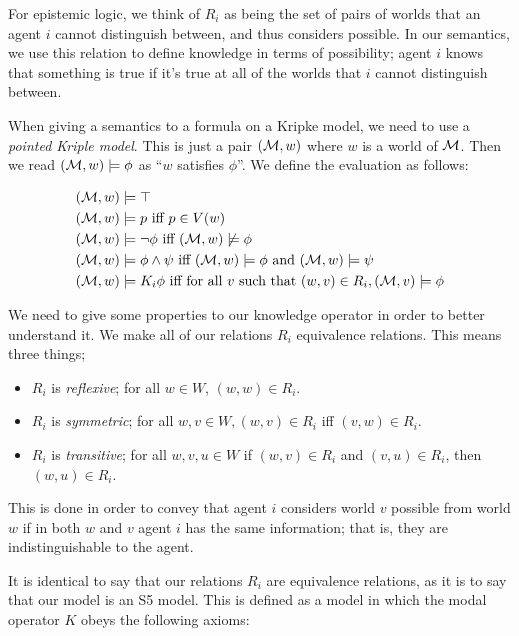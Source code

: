 \documentclass[12pt, a4paper]{article}
\begin{document}
For epistemic logic, we think of $R_i$ as being the set of pairs of worlds that
an agent $i$ cannot distinguish between, and thus considers possible. In our
semantics, we use this relation to define knowledge in terms of possibility;
agent $i$ knows that something is true if it's true at all of the worlds that
$i$ cannot distinguish between.

\bigskip

When giving a semantics to a formula on a Kripke model, we need to use a
\textit{pointed Kriple model}. This is just a pair $(\mathcal{M}, w)$ where $w$ is a
world of $\mathcal{M}$. Then we read $(\mathcal{M}, w) \models \phi$ as ``$w$ satisfies
$\phi$''. We define the evaluation as follows:

\begin{align*}
  (\mathcal{M}, w) & \models \top \\
  (\mathcal{M}, w) & \models p \text{ iff } p \in V(w) \\
  (\mathcal{M}, w) & \models \neg \phi \text{ iff } (\mathcal{M}, w) \not \models \phi \\
  (\mathcal{M}, w) & \models \phi \land \psi \text{ iff } (\mathcal{M}, w) \models \phi \text{ and } (\mathcal{M}, w) \models \psi \\
  (\mathcal{M}, w) & \models K_i \phi \text{ iff for all $v$ such that } (w, v) \in R_i, (\mathcal{M}, v) \models \phi 
\end{align*}

\bigskip 

We need to give some properties to our knowledge operator in order to better
understand it. We make all of our relations $R_i$ equivalence relations. This
means three things;

\begin{itemize}
\item $R_i$ is \textit{reflexive}; for all $w \in W$, $(w, w) \in R_i$.
\item $R_i$ is \textit{symmetric}; for all $w, v \in W, (w, v) \in R_i$ iff $(v,
  w) \in R_i$.
\item $R_i$ is \textit{transitive}; for all $w, v, u \in W$ if $(w, v) \in R_i$
  and $(v, u) \in R_i$, then $(w, u) \in R_i$.
\end{itemize}

This is done in order to convey that agent $i$ considers world $v$ possible from
world $w$ if in both $w$ and $v$ agent $i$ has the same information; that is,
they are indistinguishable to the agent.

It is identical to say that our relations $R_i$ are equivalence relations, as it
is to say that our model is an \textsf{S5} model. This is defined as a model in
which the modal operator $K$ obeys the following axioms:
\end{document}
